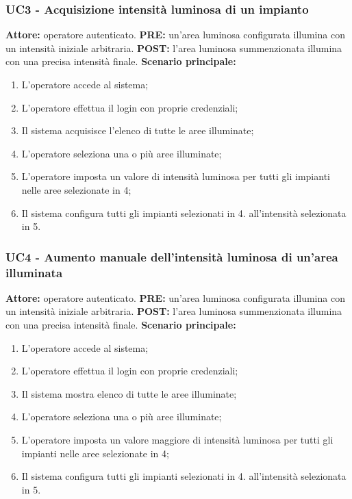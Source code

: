 \documentclass[a4paper, 12pt]{article}
\begin{document}
\subsubsection{UC3 - Acquisizione intensità luminosa di un impianto}
\textbf{Attore:} operatore autenticato.\newline
\textbf{PRE:} un'area luminosa configurata illumina con un intensità iniziale arbitraria.\newline
\textbf{POST:} l'area luminosa summenzionata illumina con una precisa intensità finale.\newline
\textbf{Scenario principale:}
\begin{enumerate}
    \item L'operatore accede al sistema;
    \item L'operatore effettua il login con proprie credenziali;
    \item Il sistema acquisisce l'elenco di tutte le aree illuminate;
    \item L'operatore seleziona una o più aree illuminate;
    \item L'operatore imposta un valore di intensità luminosa per tutti gli impianti nelle aree selezionate in 4;
    \item Il sistema configura tutti gli impianti selezionati in 4. all'intensità selezionata in 5.
\end{enumerate}

\subsubsection{UC4 - Aumento manuale dell'intensità luminosa di un'area illuminata}
\textbf{Attore:} operatore autenticato.\newline
\textbf{PRE:} un'area luminosa configurata illumina con un intensità iniziale arbitraria.\newline
\textbf{POST:} l'area luminosa summenzionata illumina con una precisa intensità finale.\newline
\textbf{Scenario principale:}
\begin{enumerate}
    \item L'operatore accede al sistema;
    \item L'operatore effettua il login con proprie credenziali;
    \item Il sistema mostra elenco di tutte le aree illuminate;
    \item L'operatore seleziona una o più aree illuminate;
    \item L'operatore imposta un valore maggiore di intensità luminosa per tutti gli impianti nelle aree selezionate in 4;
    \item Il sistema configura tutti gli impianti selezionati in 4. all'intensità selezionata in 5.
\end{enumerate}
\end{document}
